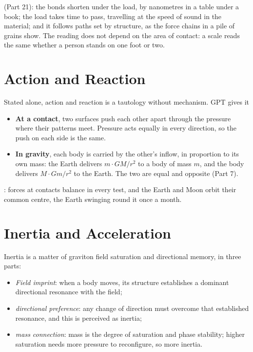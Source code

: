  (Part 21): the bonds shorten under the load, by nanometres in a table under a book; the load takes time to pass, travelling at the speed of sound in the material; and it follows paths set by structure, as the force chains in a pile of grains show. The reading does not depend on the area of contact: a scale reads the same whether a person stands on one foot or two.

\section{Action and Reaction}

Stated alone, action and reaction is a tautology without mechanism. GPT gives it 
\begin{itemize}
\item \textbf{At a contact}, two surfaces push each other apart through the pressure where their patterns meet. Pressure acts equally in every direction, so the push on each side is the same.
\item \textbf{In gravity}, each body is carried by the other's inflow, in proportion to its own mass: the Earth delivers $m\cdot GM/r^2$ to a body of mass $m$, and the body delivers $M\cdot Gm/r^2$ to the Earth. The two are equal and opposite (Part 7).
\end{itemize}
: forces at contacts balance in every test, and the Earth and Moon orbit their common centre, the Earth swinging round it once a month.

\section{Inertia and Acceleration}

Inertia is a matter of graviton field saturation and directional memory, in three parts:
\begin{itemize}
\item \textit{Field imprint}: when a body moves, its structure establishes a dominant directional resonance with the field;
\item \textit{directional preference}: any change of direction must overcome that established resonance, and this is perceived as inertia;
\item \textit{mass connection}: mass is the degree of saturation and phase stability; higher saturation needs more pressure to reconfigure, so more inertia.
\end{itemize}

